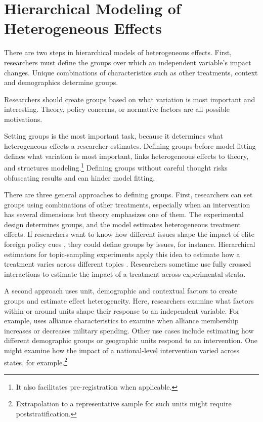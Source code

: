 \documentclass[12pt]{article}
\begin{document}
\section{Hierarchical Modeling of Heterogeneous Effects}


There are two steps in hierarchical models of heterogeneous effects. 
First, researchers must define the groups over which an independent variable's impact changes. 
Unique combinations of characteristics such as other treatments, context and demographics determine groups.


Researchers should create groups based on what variation is most important and interesting. 
Theory, policy concerns, or normative factors are all possible motivations. 


Setting groups is the most important task, because it determines what heterogeneous effects a researcher estimates. 
Defining groups before model fitting defines what variation is most important, links heterogeneous effects to theory, and structures modeling.\footnote{It also facilitates pre-registration when applicable.}
Defining groups without careful thought risks obfuscating results and can hinder model fitting.   


There are three general approaches to defining groups.  
First, researchers can set groups using combinations of other treatments, especially when an intervention has several dimensions but theory emphasizes one of them. 
The experimental design determines groups, and the model estimates heterogeneous treatment effects.   
If researchers want to know how different issues shape the impact of elite foreign policy cues \citep{GuisingerSaunders2017}, they could define groups by issues, for instance.
Hierarchical estimators for topic-sampling experiments apply this idea to estimate how a treatment varies across different topics \citep{CliffordRainey2023}. 
Researchers sometime use fully crossed interactions to estimate the impact of a treatment across experimental strata. 


A second approach uses unit, demographic and contextual factors to create groups and estimate  effect heterogeneity. 
Here, researchers examine what factors within or around units shape their response to an independent variable.
For example, \citet{Alley2021isq} uses alliance characteristics to examine when alliance membership increases or decreases military spending.
Other use cases include estimating how different demographic groups or geographic units respond to an intervention.
One might examine how the impact of a national-level intervention varied across states, for example.\footnote{Extrapolation to a representative sample for such units might require poststratification.}
\end{document}
